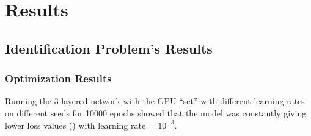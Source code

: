 \chapter{Results} \label{sec:Results}
\section{Identification Problem's Results} \label{sec:Identification Problem's Results}
\subsection{Optimization Results} \label{sec:IdProbRes - Optimization}
Running the 3-layered network with the GPU ``set'' with different learning rates on different seeds for 10000 epochs showed that the model was constantly giving lower loss values () with learning rate = $10^{-3}$. 

